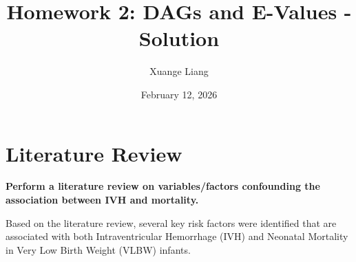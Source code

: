 \documentclass[
]{article}
\title{Homework 2: DAGs and E-Values - Solution}
\author{Xuange Liang}
\date{February 12, 2026}
\let\oldtableofcontents\tableofcontents
\renewcommand{\tableofcontents}{%
    \oldtableofcontents
    \clearpage
  }
\begin{document}
\maketitle

{
\setcounter{tocdepth}{3}
\tableofcontents
}
\hypertarget{literature-review}{%
\section{Literature Review}\label{literature-review}}

\textbf{Perform a literature review on variables/factors confounding the
association between IVH and mortality.}

Based on the literature review, several key risk factors were identified
that are associated with both Intraventricular Hemorrhage (IVH) and
Neonatal Mortality in Very Low Birth Weight (VLBW) infants.
\end{document}
